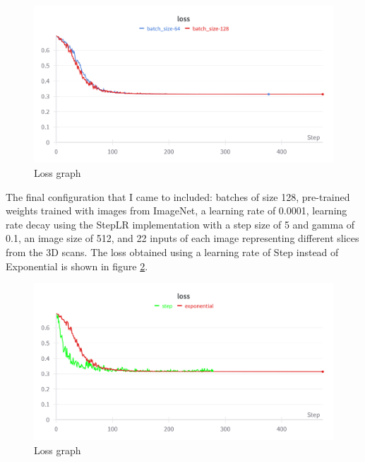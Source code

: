 \begin{figure}[!ht]
    \centering
    \includegraphics[width=1\linewidth]{figures/Figure22.png}
    \caption{Loss graph}
    \label{fig:fig21}
\end{figure}
The final configuration that I came to included: batches of size 128, pre-trained weights trained with images from ImageNet, a learning rate of 0.0001, learning rate decay using the StepLR implementation with a step size of 5 and gamma of 0.1, an image size of 512, and 22 inputs of each image representing different slices from the 3D scans. The loss obtained using a learning rate of Step instead of Exponential is shown in figure \ref{fig:fig22}.\\
\begin{figure}[!ht]
    \centering
    \includegraphics[width=1\linewidth]{figures/Figure24.png}
    \caption{Loss graph}
    \label{fig:fig22}
\end{figure}
